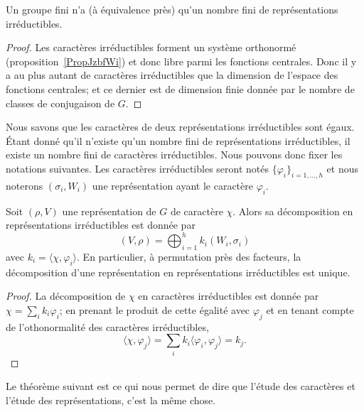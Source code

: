 \begin{lemma}
	Un groupe fini n'a (à équivalence près) qu'un nombre fini de représentations irréductibles.
\end{lemma}

\begin{proof}
	Les caractères irréductibles forment un système orthonormé (proposition~\ref{PropJzbfWi}) et donc libre parmi les fonctions centrales. Donc il y a au plus autant de caractères irréductibles que la dimension de l'espace des fonctions centrales; et ce dernier est de dimension finie donnée par le nombre de classes de conjugaison de \( G\).
\end{proof}

Nous savons que les caractères de deux représentations irréductibles sont égaux. Étant donné qu'il n'existe qu'un nombre fini de représentations irréductibles, il existe un nombre fini de caractères irréductibles. Nous pouvons donc fixer les notations suivantes. Les caractères irréductibles seront notés \( \{ \varphi_i \}_{i=1,\ldots, h}\) et nous noterons \( (\sigma_i,W_i)\) une représentation ayant le caractère \( \varphi_i\).

\begin{theorem}
	Soit \( (\rho,V)\) une représentation de \( G\) de caractère \( \chi\). Alors sa décomposition en représentations irréductibles est donnée par
	\begin{equation}
		(V,\rho)=\bigoplus_{i=1}^hk_i(W_i,\sigma_i)
	\end{equation}
	avec \( k_i=\langle \chi, \varphi_i\rangle \). En particulier, à permutation près des facteurs, la décomposition d'une représentation en représentations irréductibles est unique.
\end{theorem}

\begin{proof}
	La décomposition de \( \chi\) en caractères irréductibles est donnée par \( \chi=\sum_ik_i\varphi_i\); en prenant le produit de cette égalité avec \( \varphi_j\) et en tenant compte de l'othonormalité des caractères irréductibles,
	\begin{equation}
		\langle \chi, \varphi_j\rangle =\sum_ik_i\langle \varphi_i, \varphi_j\rangle =k_j.
	\end{equation}
\end{proof}

Le théorème suivant est ce qui nous permet de dire que l'étude des caractères et l'étude des représentations, c'est la même chose.

